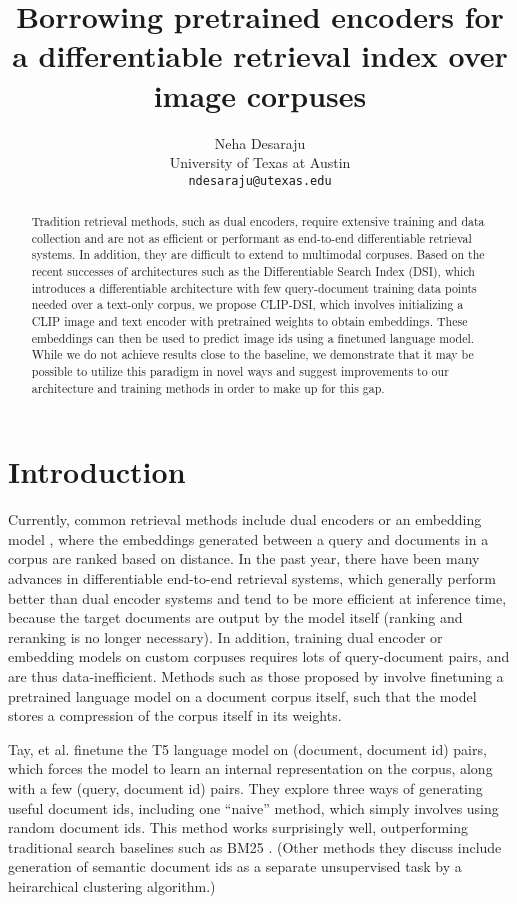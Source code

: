 \documentclass[11pt,a4paper]{article}
\title{Borrowing pretrained encoders for a differentiable retrieval index over image corpuses}
\author{Neha Desaraju \\
  University of Texas at Austin \\
  \texttt{ndesaraju@utexas.edu}}
\date{}
\begin{document}
\maketitle 

\begin{abstract}
    Tradition retrieval methods, such as dual encoders, require extensive training and data collection and are not as efficient or performant as end-to-end differentiable retrieval systems. In addition, they are difficult to extend to multimodal corpuses. Based on the recent successes of architectures such as the Differentiable Search Index (DSI), which introduces a differentiable architecture with few query-document training data points needed over a text-only corpus, we propose CLIP-DSI, which involves initializing a CLIP image and text encoder with pretrained weights to obtain embeddings. These embeddings can then be used to predict image ids using a finetuned language model. While we do not achieve results close to the baseline, we demonstrate that it may be possible to utilize this paradigm in novel ways and suggest improvements to our architecture and training methods in order to make up for this gap.
\end{abstract}

\section*{Introduction}

Currently, common retrieval methods include dual encoders or an embedding model \citep{menon2022}, where the embeddings generated between a query and documents in a corpus are ranked based on distance. In the past year, there have been many advances in differentiable end-to-end retrieval systems, which generally perform better than dual encoder systems and tend to be more efficient at inference time, because the target documents are output by the model itself (ranking and reranking is no longer necessary). In addition, training dual encoder or embedding models on custom corpuses requires lots of query-document pairs, and are thus data-inefficient. Methods such as those proposed by \citet{tay2022} involve finetuning a pretrained language model on a document corpus itself, such that the model stores a compression of the corpus itself in its weights. 

Tay, et al. finetune the T5 language model \cite{raffel2019} on (document, document id) pairs, which forces the model to learn an internal representation on the corpus, along with a few (query, document id) pairs. They explore three ways of generating useful document ids, including one ``naive'' method, which simply involves using random document ids. This method works surprisingly well, outperforming traditional search baselines such as BM25 \citep{robertson2009}. (Other methods they discuss include generation of semantic document ids as a separate unsupervised task by a heirarchical clustering algorithm.)
\end{document}

